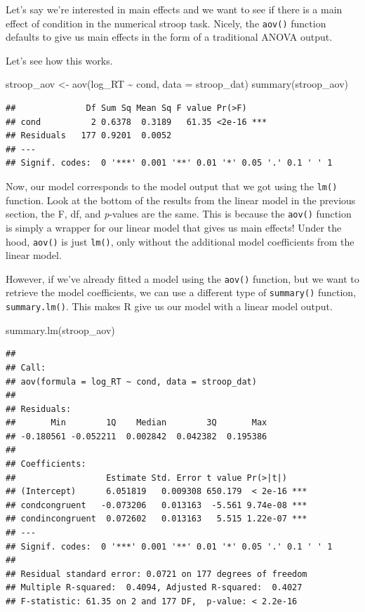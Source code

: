 \documentclass[
]{book}
\newenvironment{Shaded}{\begin{snugshade}}{\end{snugshade}}
\newcommand{\AttributeTok}[1]{\textcolor[rgb]{0.77,0.63,0.00}{#1}}
\newcommand{\FunctionTok}[1]{\textcolor[rgb]{0.00,0.00,0.00}{#1}}
\newcommand{\NormalTok}[1]{#1}
\newcommand{\OtherTok}[1]{\textcolor[rgb]{0.56,0.35,0.01}{#1}}
\newcommand{\SpecialCharTok}[1]{\textcolor[rgb]{0.00,0.00,0.00}{#1}}
\begin{document}
Let's say we're interested in main effects and we want to see if there is a main effect of condition in the numerical stroop task. Nicely, the \texttt{aov()} function defaults to give us main effects in the form of a traditional ANOVA output.

Let's see how this works.

\begin{Shaded}
\begin{Highlighting}[]
\NormalTok{stroop\_aov }\OtherTok{\textless{}{-}} \FunctionTok{aov}\NormalTok{(log\_RT }\SpecialCharTok{\textasciitilde{}}\NormalTok{ cond, }\AttributeTok{data =}\NormalTok{ stroop\_dat)}
\FunctionTok{summary}\NormalTok{(stroop\_aov)}
\end{Highlighting}
\end{Shaded}

\begin{verbatim}
##              Df Sum Sq Mean Sq F value Pr(>F)    
## cond          2 0.6378  0.3189   61.35 <2e-16 ***
## Residuals   177 0.9201  0.0052                   
## ---
## Signif. codes:  0 '***' 0.001 '**' 0.01 '*' 0.05 '.' 0.1 ' ' 1
\end{verbatim}

Now, our model corresponds to the model output that we got using the \texttt{lm()} function. Look at the bottom of the results from the linear model in the previous section, the F, df, and \emph{p}-values are the same. This is because the \texttt{aov()} function is simply a wrapper for our linear model that gives us main effects! Under the hood, \texttt{aov()} is just \texttt{lm()}, only without the additional model coefficients from the linear model.

However, if we've already fitted a model using the \texttt{aov()} function, but we want to retrieve the model coefficients, we can use a different type of \texttt{summary()} function, \texttt{summary.lm()}. This makes R give us our model with a linear model output.

\begin{Shaded}
\begin{Highlighting}[]
\FunctionTok{summary.lm}\NormalTok{(stroop\_aov)}
\end{Highlighting}
\end{Shaded}

\begin{verbatim}
## 
## Call:
## aov(formula = log_RT ~ cond, data = stroop_dat)
## 
## Residuals:
##       Min        1Q    Median        3Q       Max 
## -0.180561 -0.052211  0.002842  0.042382  0.195386 
## 
## Coefficients:
##                  Estimate Std. Error t value Pr(>|t|)    
## (Intercept)      6.051819   0.009308 650.179  < 2e-16 ***
## condcongruent   -0.073206   0.013163  -5.561 9.74e-08 ***
## condincongruent  0.072602   0.013163   5.515 1.22e-07 ***
## ---
## Signif. codes:  0 '***' 0.001 '**' 0.01 '*' 0.05 '.' 0.1 ' ' 1
## 
## Residual standard error: 0.0721 on 177 degrees of freedom
## Multiple R-squared:  0.4094, Adjusted R-squared:  0.4027 
## F-statistic: 61.35 on 2 and 177 DF,  p-value: < 2.2e-16
\end{verbatim}
\end{document}
